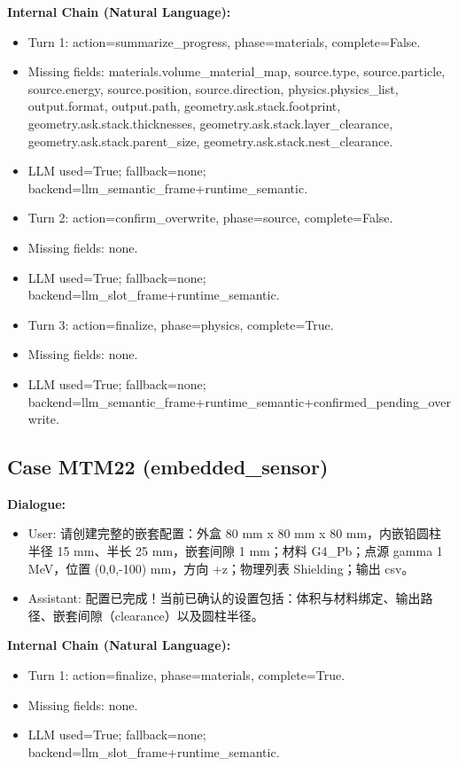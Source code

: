 \documentclass[11pt]{ctexart}
\begin{document}
\textbf{Internal Chain (Natural Language):}
\begin{itemize}
\item Turn 1: action=summarize\_progress, phase=materials, complete=False.
\item Missing fields: materials.volume\_material\_map, source.type, source.particle, source.energy, source.position, source.direction, physics.physics\_list, output.format, output.path, geometry.ask.stack.footprint, geometry.ask.stack.thicknesses, geometry.ask.stack.layer\_clearance, geometry.ask.stack.parent\_size, geometry.ask.stack.nest\_clearance.
\item LLM used=True; fallback=none; backend=llm\_semantic\_frame+runtime\_semantic.
\item Turn 2: action=confirm\_overwrite, phase=source, complete=False.
\item Missing fields: none.
\item LLM used=True; fallback=none; backend=llm\_slot\_frame+runtime\_semantic.
\item Turn 3: action=finalize, phase=physics, complete=True.
\item Missing fields: none.
\item LLM used=True; fallback=none; backend=llm\_semantic\_frame+runtime\_semantic+confirmed\_pending\_overwrite.
\end{itemize}
\subsection{Case MTM22 (embedded\_sensor)}
\textbf{Dialogue:}
\begin{itemize}
\item User: 请创建完整的嵌套配置：外盒 80 mm x 80 mm x 80 mm，内嵌铅圆柱半径 15 mm、半长 25 mm，嵌套间隙 1 mm；材料 G4\_Pb；点源 gamma 1 MeV，位置 (0,0,-100) mm，方向 +z；物理列表 Shielding；输出 csv。
\item Assistant: 配置已完成！当前已确认的设置包括：体积与材料绑定、输出路径、嵌套间隙（clearance）以及圆柱半径。
\end{itemize}
\textbf{Internal Chain (Natural Language):}
\begin{itemize}
\item Turn 1: action=finalize, phase=materials, complete=True.
\item Missing fields: none.
\item LLM used=True; fallback=none; backend=llm\_slot\_frame+runtime\_semantic.
\end{itemize}
\end{document}
